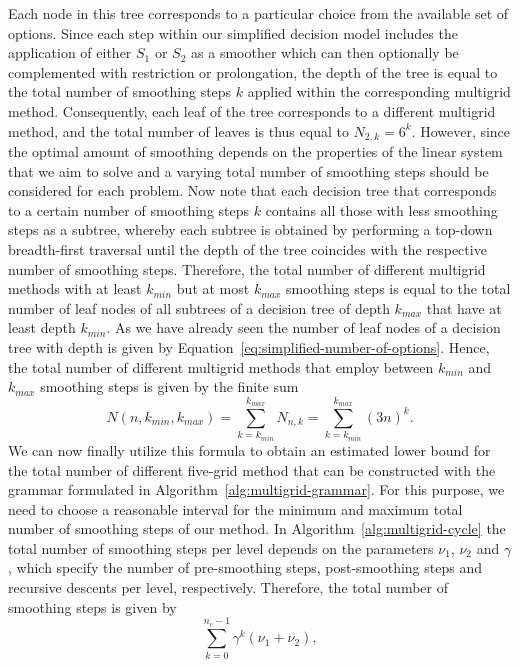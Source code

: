 Each node in this tree corresponds to a particular choice from the available set of options.
Since each step within our simplified decision model includes the application of either $S_1$ or $S_2$ as a smoother which can then optionally be complemented with restriction or prolongation, the depth of the tree is equal to the total number of smoothing steps $k$ applied within the corresponding multigrid method.
Consequently, each leaf of the tree corresponds to a different multigrid method, and the total number of leaves is thus equal to $N_{2,k} = 6^k$.
However, since the optimal amount of smoothing depends on the properties of the linear system that we aim to solve and a varying total number of smoothing steps should be considered for each problem.
Now note that each decision tree that corresponds to a certain number of smoothing steps $k$ contains all those with less smoothing steps as a subtree, whereby each subtree is obtained by performing a top-down breadth-first traversal until the depth of the tree coincides with the respective number of smoothing steps.
Therefore, the total number of different multigrid methods with at least $k_{min}$ but at most $k_{max}$ smoothing steps is equal to the total number of leaf nodes of all subtrees of a decision tree of depth $k_{max}$ that have at least depth $k_{min}$.
As we have already seen the number of leaf nodes of a decision tree with depth is given by Equation~\ref{eq:simplified-number-of-options}.
Hence, the total number of different multigrid methods that employ between $k_{min}$ and $k_{max}$ smoothing steps is given by the finite sum
\begin{equation}
	N(n, k_{min}, k_{max}) = \sum_{k = k_{min}}^{k_{max}} N_{n,k} = \sum_{k = k_{min}}^{k_{max}} (3 n)^k.
	\label{eq:search-space-estimation}
\end{equation}
We can now finally utilize this formula to obtain an estimated lower bound for the total number of different five-grid method that can be constructed with the grammar formulated in Algorithm~\ref{alg:multigrid-grammar}.
For this purpose, we need to choose a reasonable interval for the minimum and maximum total number of smoothing steps of our method.
In Algorithm~\ref{alg:multigrid-cycle} the total number of smoothing steps per level depends on the parameters $\nu_1$, $\nu_2$ and $\gamma$, which specify the number of pre-smoothing steps, post-smoothing steps and recursive descents per level, respectively.
Therefore, the total number of smoothing steps is given by
\begin{equation*}
	\sum_{k = 0}^{n_c - 1} \gamma^k (\nu_1 + \nu_2),
\end{equation*}
